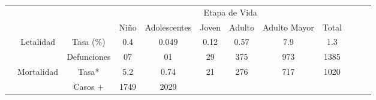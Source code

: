 	\begin{tabular}{ccc|cccccc|lll}
		\cline{4-9}
		&
		\multicolumn{1}{l}{} &
		\multicolumn{1}{l|}{} &
		\multicolumn{6}{c|}{\cellcolor[HTML]{FFCCC9}Etapa de Vida} &
		&
		&
		\\ \cline{4-9}
		&
		\multicolumn{1}{l}{} &
		\multicolumn{1}{l|}{} &
		\multicolumn{1}{l|}{\cellcolor[HTML]{FFCCC9}Niño} &
		\multicolumn{1}{l|}{\cellcolor[HTML]{FFCCC9}Adolescentes} &
		\multicolumn{1}{l|}{\cellcolor[HTML]{FFCCC9}Joven} &
		\multicolumn{1}{l|}{\cellcolor[HTML]{FFCCC9}Adulto} &
		\multicolumn{1}{l|}{\cellcolor[HTML]{FFCCC9}Adulto Mayor} &
		\multicolumn{1}{l|}{\cellcolor[HTML]{FFCCC9}Total} &
		&
		&
		\\ \cline{1-1} \cline{3-9}
		\multicolumn{1}{|c|}{\cellcolor[HTML]{FFCE93}} &
		\multicolumn{1}{c|}{\cellcolor[HTML]{FFCE93}Letalidad} &
		\cellcolor[HTML]{FFCE93}Tasa (\%) &
		\multicolumn{1}{c|}{\cellcolor[HTML]{FFCE93}0.4} &
		\multicolumn{1}{c|}{\cellcolor[HTML]{FFCE93}0.049} &
		\multicolumn{1}{c|}{\cellcolor[HTML]{FFCE93}0.12} &
		\multicolumn{1}{c|}{\cellcolor[HTML]{FFCE93}0.57} &
		\multicolumn{1}{c|}{\cellcolor[HTML]{FFCE93}7.9} &
		\cellcolor[HTML]{FFCE93}1.3 &
		\multicolumn{1}{c}{} &
		\multicolumn{1}{c}{} &
		\multicolumn{1}{c}{} \\ \cline{3-9}
		\multicolumn{1}{|c|}{\cellcolor[HTML]{FFCE93}} &
		\multicolumn{1}{c|}{\cellcolor[HTML]{FFCE93}} &
		\cellcolor[HTML]{FFCE93}Defunciones &
		\multicolumn{1}{c|}{\cellcolor[HTML]{FFCE93}07} &
		\multicolumn{1}{c|}{\cellcolor[HTML]{FFCE93}01} &
		\multicolumn{1}{c|}{\cellcolor[HTML]{FFCE93}29} &
		\multicolumn{1}{c|}{\cellcolor[HTML]{FFCE93}375} &
		\multicolumn{1}{c|}{\cellcolor[HTML]{FFCE93}973} &
		\cellcolor[HTML]{FFCE93}1385 &
		\multicolumn{1}{c}{} &
		\multicolumn{1}{c}{} &
		\multicolumn{1}{c}{} \\ \cline{3-9}
		\multicolumn{1}{|c|}{\cellcolor[HTML]{FFCE93}} &
		\multicolumn{1}{c|}{\cellcolor[HTML]{FFCE93}Mortalidad} &
		\cellcolor[HTML]{FFCE93}Tasa* &
		\multicolumn{1}{c|}{\cellcolor[HTML]{FFCE93}5.2} &
		\multicolumn{1}{c|}{\cellcolor[HTML]{FFCE93}0.74} &
		\multicolumn{1}{c|}{\cellcolor[HTML]{FFCE93}21} &
		\multicolumn{1}{c|}{\cellcolor[HTML]{FFCE93}276} &
		\multicolumn{1}{c|}{\cellcolor[HTML]{FFCE93}717} &
		\cellcolor[HTML]{FFCE93}1020 &
		&
		&
		\\ \cline{3-9}
		\multicolumn{1}{|c|}{\cellcolor[HTML]{FFCE93}} &
		\multicolumn{1}{c|}{\cellcolor[HTML]{FFCE93}} &
		\cellcolor[HTML]{FFCE93}Casos + &
		\multicolumn{1}{c|}{\cellcolor[HTML]{FFCE93}1749} &
		\multicolumn{1}{c|}{\cellcolor[HTML]{FFCE93}2029} &

\end{tabular}
